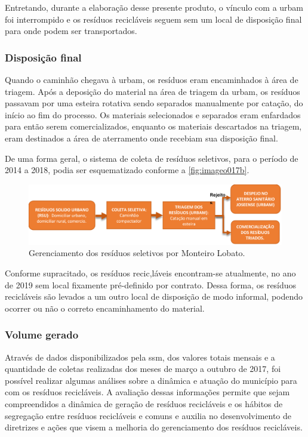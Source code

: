 	Entretando,  durante a elaboração desse presente produto, o vínculo com a \gls{urbam} foi interrompido e os resíduos recicláveis seguem sem um local de disposição final para onde podem ser transportados.
	
	\subsubsection{Disposição final}
	
	Quando o caminhão chegava à \gls{urbam}, os resíduos eram encaminhados à área de triagem. Após a deposição do material na área de triagem da \gls{urbam}, os resíduos passavam por uma esteira rotativa sendo separados manualmente por catação, do início ao fim do processo. Os materiais selecionados e separados eram enfardados para então serem comercializados, enquanto os materiais descartados na triagem, eram destinados a área de aterramento onde recebiam sua disposição final. 
	
	De uma forma geral, o sistema de coleta de resíduos seletivos, para o período de 2014 a 2018, podia ser esquematizado conforme a \autoref{fig:imageo017b}.
	
	\begin{figure}
	\centering
	\includegraphics[width=0.75\linewidth]{produtos/prodtres/image017b}
	\caption{Gerenciamento dos resíduos seletivos por Monteiro Lobato.}
	\label{fig:image017b}
	\end{figure}

	Conforme supracitado, os resíduos recic,láveis encontram-se atualmente, no ano de 2019 sem local fixamente pré-definido por contrato. Dessa forma, os resíduos recicláveis são levados a um outro local de disposição de modo informal, podendo ocorrer ou não o correto encaminhamento do material.
	
	\subsubsection{Volume gerado}
	
	Através de dados disponibilizados pela \gls{ssm}, dos valores totais mensais e a quantidade de coletas realizadas dos meses de março a outubro de 2017, foi possível realizar algumas análises sobre a dinâmica e atuação do município para com os resíduos recicláveis. A avaliação dessas informações permite que sejam compreendidos a dinâmica de geração de resíduos recicláveis e os hábitos de segregação entre resíduos recicláveis e comuns e auxilia no desenvolvimento de diretrizes e ações que visem a melhoria do gerenciamento dos resíduos recicláveis.
	
